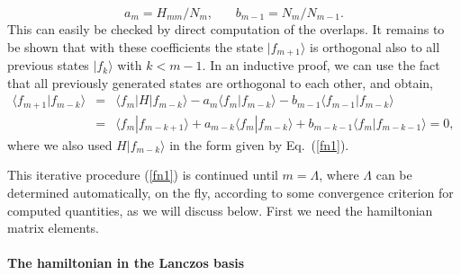 \documentclass[draft,numberedheadings]{aipproc}
\begin{document}
\begin{equation}
a_m = H_{mm}/N_m,~~~~~~~~
b_{m-1} = N_m/N_{m-1}.
\label{abmlanczos}
\end{equation}
This can easily be checked by direct computation of the overlaps. It remains to be shown that with these coefficients the state $|f_{m+1}\rangle$ is orthogonal also 
to all previous states $|f_{k}\rangle$ with $k<m-1$. In an inductive proof, we can use the fact that all previously generated states are orthogonal to each other,
and obtain, 
\begin{eqnarray}
\langle f_{m+1}|f_{m-k}\rangle & = & 
\langle f_m|H|f_{m-k}\rangle -a_m\langle f_m|f_{m-k}\rangle 
-b_{m-1}\langle f_{m-1}|f_{m-k}\rangle  \\
& = & \langle f_m|f_{m-k+1}\rangle +a_{m-k}\langle f_m|f_{m-k}\rangle 
+ b_{m-k-1}\langle f_m|f_{m-k-1}\rangle = 0,~~ \nonumber
\end{eqnarray}
where we also used $H|f_{m-k}\rangle$ in the form given by Eq.~(\ref{fn1}). 

This iterative procedure (\ref{fn1}) is continued until $m=\Lambda$, where $\Lambda$ can be determined automatically, on the fly, 
according to some convergence criterion for computed quantities, as we will discuss below. First we need the hamiltonian matrix elements.


\paragraph{The hamiltonian in the Lanczos basis}
\end{document}
